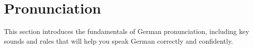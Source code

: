 \section{Pronunciation}\label{sec:pronunciation}

This section introduces the fundamentals of German pronunciation, including key sounds and rules that will help you speak German correctly and confidently.